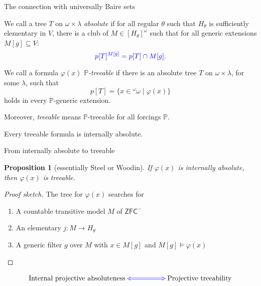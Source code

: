 \documentclass[handout, dvipsnames, usenames, 9pt, serif]{beamer}
\newtheorem{proposition}{Proposition}
\newcommand{\PP}{\mathbb{P}}
\newcommand{\IA}{\mathsf{IA}}
\newcommand{\BS}{{}^\omega\omega}
\newcommand{\cb}{\color{blue}}
\begin{document}
\begin{frame}{The connection with universally Baire sets} 


\begin{definition} 
We call a tree $T$ on $\omega\times \lambda$ {\cb \emph{absolute}} if for all regular $\theta$ such that $H_\theta$ is sufficiently elementary in $V$, there is a club of $M\in[ H_\theta]^\omega$ such that for all generic extensions $M[g]\subseteq V$: 
$$ {\cb  p[T]^{M[g]}=p[T]\cap M[g].} $$ 
\end{definition} 

\pause 
\begin{definition} 
We call a formula $\varphi(x)$ {\cb \emph{$\PP$-treeable}} if there is an absolute tree $T$ on $\omega\times \lambda$, for some $\lambda$, such that 
$$p[T] = \{ x \in \BS \mid \varphi(x)\}$$ 
holds in every $\PP$-generic extension. 

\medskip 
Moreover, {\cb \emph{treeable}} means $\PP$-treeable for all forcings $\PP$. 
\end{definition} 
\pause  

\begin{fact} 
Every treeable formula is internally absolute. 
\end{fact} 


\end{frame}



\begin{frame}{From internally absolute to treeable} 

\begin{proposition}[essentially Steel or Woodin] 
If $\varphi(x)$ is internally absolute, then $\varphi(x)$ is treeable. 
\end{proposition} 
\pause  

\medskip 
\begin{proof}[Proof sketch] 
The tree for $\varphi(x)$ searches for 
\begin{enumerate} 
\item[1.] 
A countable transitive model $M$ of $\mathsf{ZFC}^-$ 
\item[2.] 
An elementary $j\colon M\rightarrow H_\theta$ 
\item[3.] 
A generic filter $g$ over $M$ with $x\in M[g]$ and $M[g]\models \varphi(x)$ 
\end{enumerate} 
\end{proof} 

\medskip 

\xymatrixrowsep{0.4cm}
\xymatrixcolsep{0.2cm}
\[ \xymatrix{ 
\text{Internal projective absoluteness} \ar@{<=>}@[blue][rr] & & \text{Projective treeability}  
} 
\] 

\end{frame}
\end{document}
